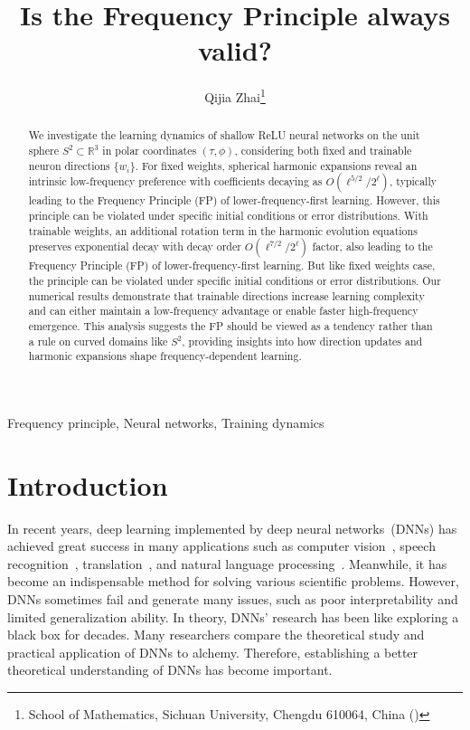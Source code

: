 \documentclass[review,onefignum,onetabnum,onealgnum]{siamart250106}
\title{Is the Frequency Principle always valid?}
\author{Qijia Zhai\thanks{School of Mathematics, Sichuan University, Chengdu 610064, China
 (\email{zhaiqijia@stu.scu.edu.cn})}}
\numberwithin{theorem}{section}
\begin{document}
\maketitle

\begin{abstract}
We investigate the learning dynamics of shallow ReLU neural networks on the unit sphere \(S^2\subset\mathbb{R}^3\) in polar coordinates \((\tau,\phi)\), considering both fixed and trainable neuron directions \(\{w_i\}\). For fixed weights, spherical harmonic expansions reveal an intrinsic low-frequency preference with coefficients decaying as \(O(\ell^{5/2}/2^\ell)\), typically leading to the Frequency Principle (FP) of lower-frequency-first learning. However, this principle can be violated under specific initial conditions or error distributions. With trainable weights, an additional rotation term in the harmonic evolution equations preserves exponential decay with decay order \(O(\ell^{7/2}/2^\ell)\) factor, also leading to the Frequency Principle (FP) of lower-frequency-first learning. But like fixed weights case, the principle can be violated under specific initial conditions or error distributions. Our numerical results demonstrate that trainable directions increase learning complexity and can either maintain a low-frequency advantage or enable faster high-frequency emergence. This analysis suggests the FP should be viewed as a tendency rather than a rule on curved domains like \(S^2\), providing insights into how direction updates and harmonic expansions shape frequency-dependent learning.
\end{abstract}


\begin{keywords}
Frequency principle, Neural networks, Training dynamics
\end{keywords}


\section{Introduction}
\label{Sec:Introduction}
In recent years, deep learning implemented by deep neural networks~(DNNs) has achieved great success in many applications such as computer vision~\cite{feng2019computer, xie2019source, o2020deep}, speech recognition~\cite{pan2012investigation, deng2013new, seltzer2013investigation}, translation~\cite{singh2017machine, zhang2015deep, yang2020survey}, and natural language processing~\cite{chowdhary2020natural, nadkarni2011natural, bird2009natural, khurana2023natural, liddy2001natural, eisenstein2019introduction}. Meanwhile, it has become an indispensable method for solving various scientific problems. However, DNNs sometimes fail and generate many issues, such as poor interpretability and limited generalization ability. In theory, DNNs' research has been like exploring a black box for decades. Many researchers compare the theoretical study and practical application of DNNs to alchemy. Therefore, establishing a better theoretical understanding of DNNs has become important.
\end{document}
